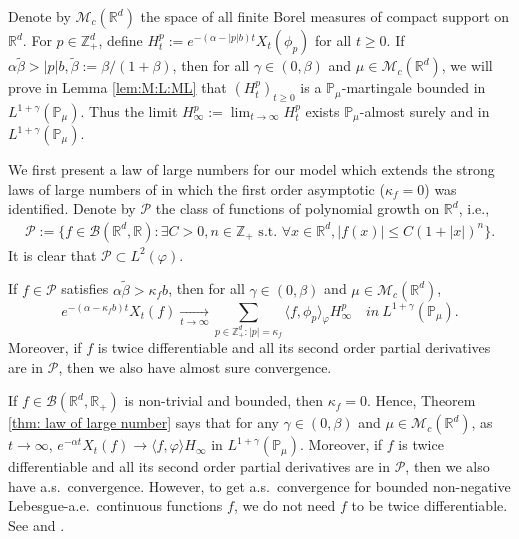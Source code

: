 \documentclass[EJP]{ejpecp} %
\begin{document}
Denote by $\mathcal M_c(\mathbb R^d)$ the space of all finite Borel measures of compact support on $\mathbb R^d$.
For $p\in \mathbb{Z}_+^d$, define
\(
  H_t^p
  := e^{-(\alpha-|p|b)t}X_t(\phi_p)
\)
for all $t\geq 0$.
If $\alpha \tilde \beta>|p|b, \tilde \beta := \beta/(1+\beta)$, then for all $\gamma\in (0, \beta)$ and $\mu\in \mathcal M_c(\mathbb R^d)$, we will prove in Lemma \ref{lem:M:L:ML} that $(H_t^p)_{t\geq 0}$ is a $\mathbb{P}_{\mu}$-martingale bounded in $L^{1+\gamma}(\mathbb{P}_{\mu})$.
Thus the limit $H^p_{\infty}:=\lim_{t\rightarrow \infty}H_t^p$ exists $\mathbb{P}_{\mu}$-almost surely and in $L^{1+\gamma}(\mathbb{P}_{\mu})$.

We first present a law of large numbers for our model which extends the strong laws of large numbers of \cite{ChenRenYang2019Skeleton, EckhoffKyprianouWinkel2015Spines} in which the first order asymptotic ($\kappa_f=0$) was identified.
Denote by $\mathcal P$ the class of functions of polynomial growth on $\mathbb R^d$, i.e.,
\begin{align}
  \label{eq: polynomial growth function}
  \mathcal{P}
  := \{f\in \mathcal B(\mathbb R^d, \mathbb R):\exists C>0, n \in \mathbb Z_+ \text{~s.t.~} \forall x\in \mathbb R^d, |f(x)|\leq C(1+|x|)^n \}.
\end{align}
It is clear that $\mathcal{P} \subset L^2(\varphi)$.
\begin{theorem}
  \label{thm: law of large number}
  If $f \in \mathcal{P}$ satisfies $\alpha\tilde \beta>\kappa_f b$, then for all $\gamma\in (0, \beta)$ and  $\mu\in \mathcal M_c(\mathbb R^d)$,
  \[
    e^{-(\alpha-\kappa_fb)t}X_t(f)
    \xrightarrow[t\to \infty]{}\sum_{p\in \mathbb Z_+^d:|p|=\kappa_f}\langle f, \phi_p\rangle_{\varphi} H_{\infty}^p
    \quad in~ L^{1+\gamma}(\mathbb{P}_{\mu}).
  \]
  Moreover, if $f$ is twice differentiable and all its second order partial derivatives are in $\mathcal{P}$, then we also have almost sure convergence.
\end{theorem}
If $f\in \mathcal B(\mathbb R^d, \mathbb R_+)$ is non-trivial and  bounded, then $\kappa_f=0$.
Hence, Theorem \ref{thm: law of large number} says that for any $\gamma\in (0, \beta)$ and  $\mu\in \mathcal M_c(\mathbb R^d)$, as $t\rightarrow \infty$,
\(
  e^{-\alpha t}X_t(f)
  \rightarrow \langle f, \varphi\rangle H_{\infty}
\)
in $L^{1+\gamma}(\mathbb{P}_{\mu})$.
Moreover, if $f$ is twice differentiable and all its second order partial derivatives are in $\mathcal{P}$, then we also have a.s.\ convergence.
However, to get a.s.\ convergence for bounded non-negative
Lebesgue-a.e.\ continuous functions $f$, we do not need $f$ to be twice differentiable.
See \cite[Theorem 2.13 \& Example 8.1]{ChenRenYang2019Skeleton} and \cite[Theorem 1.2 \& Example 4.1]{EckhoffKyprianouWinkel2015Spines}.
\end{document}
